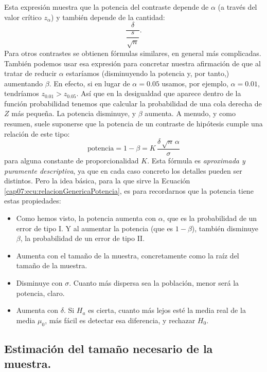 Esta expresión muestra que la potencia del contraste depende de $\alpha$ (a través del valor crítico $z_{\alpha}$) y también depende de la cantidad:
\[\dfrac{\delta}{\dfrac{s}{\sqrt{n}}}.\]
Para otros contrastes se obtienen fórmulas similares, en general más complicadas. También podemos usar esa expresión para concretar nuestra afirmación de que al tratar de reducir $\alpha$ estaríamos (disminuyendo la potencia y, por tanto,) aumentando $\beta$. En efecto, si en lugar de $\alpha=0.05$ usamos, por ejemplo, $\alpha=0.01$, tendríamos $z_{0.01}>z_{0.05}$. Así que en la desigualdad que aparece dentro de la función probabilidad tenemos que calcular la probabilidad de una cola derecha de $Z$ más pequeña. La potencia disminuye, y $\beta$ aumenta. A menudo, y como resumen, suele suponerse que la potencia de un contraste de hipótesis cumple una relación de este tipo:
    \begin{equation}
    \label{cap07:ecu:relacionGenericaPotencia}
    \mbox{potencia}=1-\beta = K\, \dfrac{\delta\,\sqrt{n}\,\alpha}{\sigma}
    \end{equation}
para alguna constante de proporcionalidad $K$.  Esta fórmula es {\em aproximada y puramente descriptiva}, ya que en cada caso concreto los detalles pueden ser distintos. Pero la idea básica, para la que sirve la Ecuación \ref{cap07:ecu:relacionGenericaPotencia}, es para recordarnos que la potencia tiene estas propiedades:
\begin{itemize}
  \item Como hemos visto, la potencia aumenta con $\alpha$, que es la probabilidad de un error de tipo I. Y al aumentar la potencia (que es $1-\beta$), también disminuye $\beta$, la probabilidad de un error de tipo II.
  \item Aumenta con el tamaño de la muestra, concretamente como la raíz del tamaño de la muestra.
  \item Disminuye con $\sigma$. Cuanto más dispersa sea la población, menor será la potencia, claro.
  \item Aumenta con $\delta$. Si $H_a$ es cierta, cuanto más lejos esté la media real de la media $\mu_0$, más fácil es detectar esa diferencia, y rechazar $H_0$.
\end{itemize}

\subsection{Estimación del tamaño necesario de la muestra.}
\label{cap07:subsec:EstimacionTamannoMuestra}


